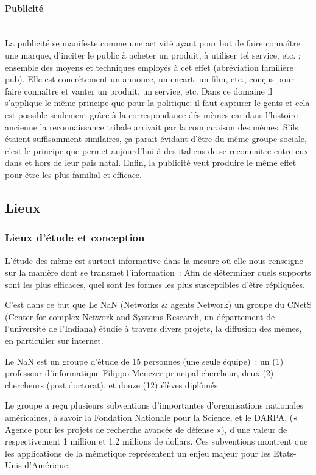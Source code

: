 \documentclass[12pt]{article}
\newcommand{\myparagraph}[1]{\paragraph{#1}\mbox{}\\}
\begin{document}
\myparagraph{Publicité}
La publicité se manifeste comme une activité ayant pour but de faire
connaître une marque, d'inciter le public à acheter un produit, à
utiliser tel service, etc. ; ensemble des moyens et techniques employés
à cet effet (abréviation familière pub). Elle est concrètement un
annonce, un encart, un film, etc., conçus pour faire connaître et vanter
un produit, un service, etc. Dans ce domaine il s'applique le même
principe que pour la politique: il faut capturer le gents et cela est
possible seulement grâce à la correspondance dés mèmes car dans
l'histoire ancienne la reconnaissance tribale arrivait par la
comparaison des mèmes. \cite{dang:hal-00576540}  S'ils étaient suffisamment similaires, ça parait
évidant d'être du même groupe sociale, c'est le principe que permet
aujourd'hui à des italiens de se reconnaitre entre eux dans et hors de
leur pais natal. Enfin, la publicité veut produire le même effet pour
être les plus familial et efficace.


\subsection{Lieux}


\subsubsection{Lieux d'étude et conception}

L'étude des mème est surtout informative dans la mesure où elle nous
renseigne sur la manière dont se transmet l'information~: Afin de
déterminer quels supports sont les plus efficaces, quel sont les formes
les plus susceptibles d'être répliquées.

C'est dans ce but que Le NaN (Networks \& agents Network) un groupe du
CNetS (Center for complex Network and Systems Research, un département
de l'université de l'Indiana) étudie à travers divers projets, la
diffusion des mèmes, en particulier sur internet.

Le NaN est un groupe d'étude de 15 personnes (une seule équipe)~: un (1)
professeur d'informatique Filippo Menczer principal chercheur, deux (2)
chercheurs (post doctorat), et douze (12) élèves diplômés.

Le groupe a reçu plusieurs subventions d'importantes d'organisations
nationales américaines, à savoir la Fondation Nationale pour la Science,
et le DARPA, (« Agence pour les projets de recherche avancée de défense
»), d'une valeur de respectivement 1 million et 1,2 millions de dollars.
Ces subventions montrent que les applications de la mémetique
représentent un enjeu majeur pour les Etats-Unis d'Amérique.
\end{document}

